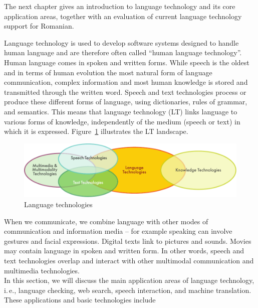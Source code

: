 \begin{multicols}{2}
The next chapter gives an introduction to language technology and its core application areas, together with an evaluation of current language technology support for Romanian.

\end{multicols}

\clearpage


\begin{multicols}{2}

Language technology is used to develop software systems designed to handle human language and are therefore often called ``human language technology''. Human language comes in spoken and written forms. While speech is the oldest and in terms of human evolution the most natural form of language communication, complex information and most human knowledge is stored and transmitted through the written word. Speech and text technologies process or produce these different forms of language, using dictionaries, rules of grammar, and semantics. This means that language technology (LT) links language to various forms of knowledge, independently of the medium (speech or text) in which it is expressed. Figure~\ref{fig:ltincontext_en} illustrates the LT landscape.

\begin{figure}[htb]
  \center
  \includegraphics[width=\textwidth]{../_media/english/language_technologies}
  \caption{Language technologies}
  \label{fig:ltincontext_en}
  \vspace{-15mm}
\end{figure}

When we communicate, we combine language with other modes of communication and information media -- for example speaking can involve gestures and facial expressions. Digital texts link to pictures and sounds. Movies may contain language in spoken and written form. In other words, speech and text technologies overlap and interact with other multimodal communication and multimedia technologies.\\ 
In this section, we will discuss the main application areas of language technology, i.\,e., language checking, web search, speech interaction, and machine translation. These applications and basic technologies include 


\end{multicols}
